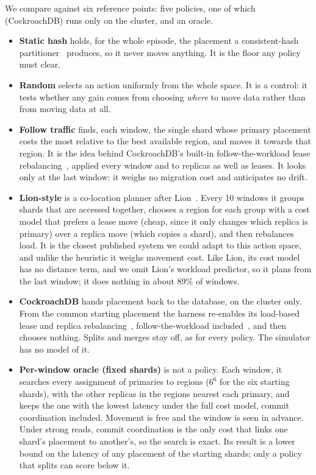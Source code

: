 We compare against six reference points: five policies, one of which (CockroachDB) runs only on the cluster, and an oracle.

\begin{itemize}
\item \textbf{Static hash} holds, for the whole episode, the placement a
consistent-hash partitioner~\cite{karger1997consistent} produces, so it never
moves anything. It is the floor any policy must clear.
\item \textbf{Random} selects an action uniformly from the whole space. It is a control: it
tests whether any gain comes from choosing \emph{where} to move data rather than
from moving data at all.
\item \textbf{Follow traffic} finds, each window, the single shard whose
primary placement costs the most relative to the best available region, and
moves it towards that region. It is the idea behind CockroachDB's built-in
follow-the-workload lease rebalancing~\cite{crdb2025ftw}, applied every window
and to replicas as well as leases. It looks only at the last window: it weighs
no migration cost and anticipates no drift.
\item \textbf{Lion-style} is a co-location planner after
Lion~\cite{lion2024}. Every 10 windows it groups shards that are accessed
together, chooses a region for each group with a cost model that prefers a
lease move (cheap, since it only changes which replica is primary) over a replica move (which copies a shard), and then
rebalances load. It is the closest published system we could adapt to this
action space, and unlike the heuristic it weighs movement cost. Like Lion, its
cost model has no distance term, and we omit Lion's workload predictor, so it
plans from the last window; it does nothing in about 89\% of windows.
\item \textbf{CockroachDB} hands placement back to the database, on the
cluster only. From the common starting placement the harness re-enables its
load-based lease and replica rebalancing~\cite{crdb2025settings}, follow-the-workload included~\cite{crdb2025ftw}, and then chooses nothing. Splits and merges stay
off, as for every policy. The simulator has no model of it.
\item \textbf{Per-window oracle (fixed shards)} is not a policy. Each window,
it searches every assignment of primaries to regions ($6^6$ for the six
starting shards), with the other replicas in the regions nearest each primary, and
keeps the one with the lowest latency under the full cost model, commit
coordination included. Movement is free and the window is seen in advance.
Under strong reads, commit coordination is the only cost that links one shard's
placement to another's, so the search is exact. Its result is a lower bound on the latency of any placement of the
starting shards; only a policy that splits can score below it.
\end{itemize}

